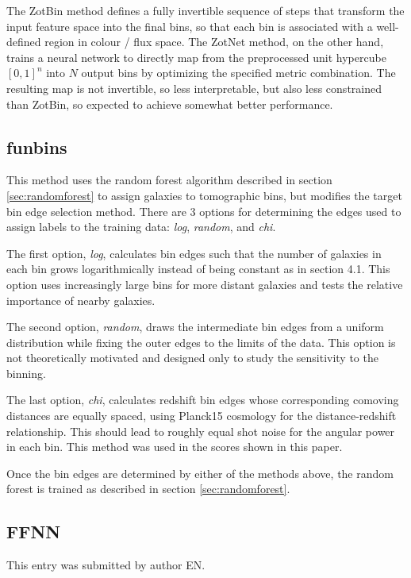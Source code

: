 \documentclass[twocolumn,twocolappendix]{aastex63}
\begin{document}
The ZotBin method defines a fully invertible sequence of steps that transform the input feature space into
the final bins, so that each bin is associated with a well-defined region in colour / flux space. The ZotNet method,
on the other hand, trains a neural network to directly map from the preprocessed unit hypercube $[0,1]^n$ into
$N$ output bins by optimizing the specified metric combination. The resulting map is not invertible, so less
interpretable, but also less constrained than ZotBin, so expected to achieve somewhat better performance.

\subsection{ {\sc funbins} } \label{sec:funbins}
This method uses the random forest algorithm described in section \ref{sec:randomforest} to assign galaxies to tomographic bins, but modifies the target bin edge selection method. There are 3 options for determining the edges used to assign labels to the training data: \textit{log}, \textit{random}, and \textit{chi}. 

The first option, \textit{log}, calculates bin edges such that the number of galaxies in each bin grows logarithmically instead of being constant as in section 4.1. This option uses increasingly large bins for more distant galaxies and tests the relative importance of nearby galaxies.

The second option, \textit{random}, draws the intermediate bin edges from a uniform distribution while fixing the outer edges to the limits of the data. This option is not theoretically motivated and designed only to study the sensitivity to the binning. 

The last option, \textit{chi}, calculates redshift bin edges whose corresponding comoving distances are equally spaced, using Planck15 \citep{Planck15} cosmology for the distance-redshift relationship. This should lead to roughly equal shot noise for the angular power in each bin. 
This method was used in the scores shown in this paper.

Once the bin edges are determined by either of the methods above, the random forest is trained as described in section \ref{sec:randomforest}.

\subsection{FFNN}
This entry was submitted by author EN.
\end{document}
